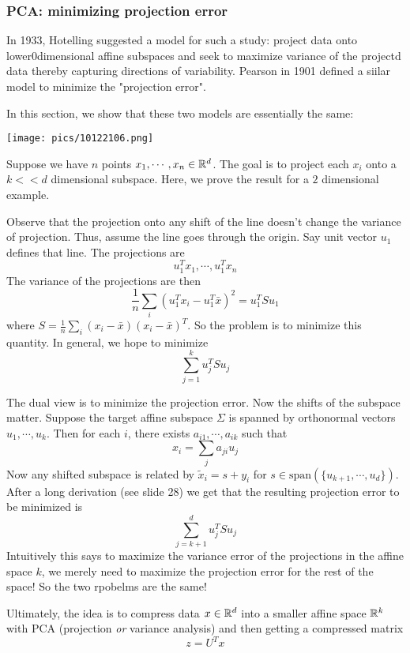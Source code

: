 \documentclass[11pt]{scrartcl}
\begin{document}
\subsubsection{PCA: minimizing projection error}

In 1933, Hotelling suggested a model for such a study: project data onto lower0dimensional affine subspaces and seek to maximize variance of the projectd data thereby capturing directions of variability. Pearson in 1901 defined a siilar model to minimize the "projection error". 

In this section, we show that these two models are essentially the same:
\begin{center}
    \texttt{[image: pics/10122106.png]}
\end{center}

Suppose we have $n$ points $x_1, \cdots, x_n \in \mathbb{R}^{d}$. The goal is to project each $x_i$ onto a $k<<d$ dimensional subspace. Here, we prove the result for a $2$ dimensional example.

Observe that the projection onto any shift of the line doesn't change the variance of projection. Thus, assume the line goes through the origin. Say unit vector $u_1$ defines that line. The projections are $$u_1^{T}x_1, \cdots, u_1^{T}x_n$$
The variance of the projections are then 
$$\frac{1}{n}\sum_{i}(u_{1}^{T}x_i-u_1^{T}\bar{x})^2=u_{1}^{T}Su_{1}$$ where $S=\frac{1}{n}\sum_{i}(x_i-\bar{x})(x_i-\bar{x})^{T}$. So the problem is to minimize this quantity. In general, we hope to minimize 
$$\sum_{j=1}^{k}u_j^{T}Su_j$$

The dual view is to minimize the projection error. Now the shifts of the subspace matter. Suppose the target affine subspace $\Sigma$ is spanned by orthonormal vectors $u_1, \cdots, u_k$. Then for each $i$, there exists $a_{i1}, \cdots, a_{ik}$ such that $$x_{i}=\sum_{j}a_{ji}u_j$$
Now any shifted subspace is related by $\tilde{x}_i= s+ y_i$ for $s \in \text{span}(\{u_{k+1},\cdots, u_d\})$. After a long derivation (see slide 28) we get that the resulting projection error to be minimized is  $$\sum_{j=k+1}^{d}u_j^{T}Su_j$$
Intuitively this says to maximize the variance error of the projections in the affine space $k$, we merely need to maximize the projection error for the rest of the space! So the two rpobelms are the same!

Ultimately, the idea is to compress data $x \in \mathbb{R}^{d}$ into a smaller affine space $\mathbb{R}^{k}$ with PCA (projection \textit{or} variance analysis) and then getting a compressed matrix $$z=U^{T}x$$
\end{document}
